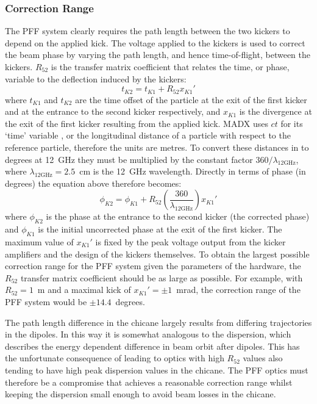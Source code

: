 \subsubsection{Correction Range}

The PFF system clearly requires the path length between the two kickers to depend on the applied kick.  
The voltage applied to the kickers is used to correct the beam phase by varying the path length, and hence time-of-flight, between the kickers. \(R_{52}\) is the transfer matrix coefficient that relates the time, or phase, variable to the deflection induced by the kickers:
\begin{equation}
t_{K2} = t_{K1} + R_{52}x_{K1}'
\end{equation}
where \(t_{K1}\) and \(t_{K2}\) are the time offset of the particle at the exit of the first kicker and at the entrance to the second kicker respectively, and \(x_{K1}\) is the divergence at the exit of the first kicker resulting from the applied kick. MADX uses \(ct\) for its `time' variable \cite{madx}, or the longitudinal distance of a particle with respect to the reference particle, therefore the units are metres. To convert these distances in to degrees at 12~GHz they must be multiplied by the constant factor \(360/\lambda_{\mathrm{12GHz}}\), where \(\lambda_{\mathrm{12GHz}} = 2.5\)~cm is the 12~GHz wavelength. Directly in terms of phase (in degrees) the equation above therefore becomes:
\begin{equation}
\phi_{K2} = \phi_{K1} + R_{52}\left(\frac{360}{\lambda_{\mathrm{12GHz}}}\right)x_{K1}'
\end{equation}
where \(\phi_{K2}\) is the phase at the entrance to the second kicker (the corrected phase) and \(\phi_{K1}\) is the initial uncorrected phase at the exit of the first kicker. The maximum value of \(x_{K1}'\) is fixed by the peak voltage output from the kicker amplifiers and the design of the kickers themselves. To obtain the largest possible correction range for the PFF system given the parameters of the hardware, the \(R_{52}\) transfer matrix coefficient should be as large as possible. For example, with \(R_{52} = 1\)~m and a maximal kick of \(x_{K1}' = \pm 1\)~mrad, the correction range of the PFF system would be \(\pm 14.4\)~degrees.

The path length difference in the chicane largely results from differing trajectories in the dipoles. In this way it is somewhat analogous to the dispersion, which describes the energy dependent difference in beam orbit after dipoles. This has the unfortunate consequence of leading to optics with high \(R_{52}\) values also tending to have high peak dispersion values in the chicane. The PFF optics must therefore be a compromise that achieves a reasonable correction range whilst keeping the dispersion small enough to avoid beam losses in the chicane.

